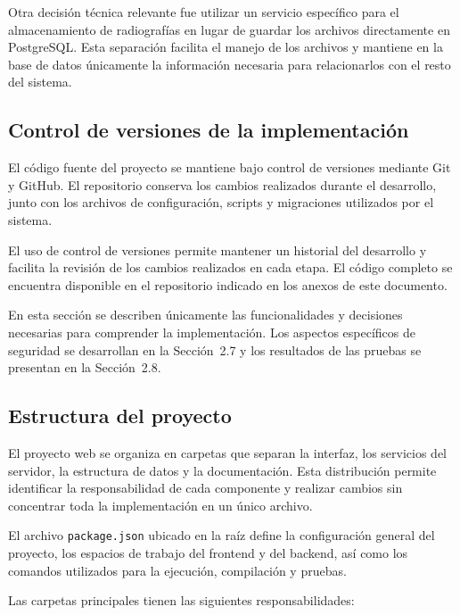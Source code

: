 Otra decisión técnica relevante fue utilizar un servicio específico para el
almacenamiento de radiografías en lugar de guardar los archivos directamente
en PostgreSQL. Esta separación facilita el manejo de los archivos y mantiene
en la base de datos únicamente la información necesaria para relacionarlos
con el resto del sistema.

\subsection{Control de versiones de la implementación}

El código fuente del proyecto se mantiene bajo control de versiones mediante
Git y GitHub. El repositorio conserva los cambios realizados durante el
desarrollo, junto con los archivos de configuración, scripts y migraciones
utilizados por el sistema.

El uso de control de versiones permite mantener un historial del desarrollo y
facilita la revisión de los cambios realizados en cada etapa. El código
completo se encuentra disponible en el repositorio indicado en los anexos de
este documento.

En esta sección se describen únicamente las funcionalidades y decisiones
necesarias para comprender la implementación. Los aspectos específicos de
seguridad se desarrollan en la Sección~2.7 y los resultados de las pruebas se
presentan en la Sección~2.8.

\subsection{Estructura del proyecto}

El proyecto web se organiza en carpetas que separan la interfaz, los
servicios del servidor, la estructura de datos y la documentación. Esta
distribución permite identificar la responsabilidad de cada componente y
realizar cambios sin concentrar toda la implementación en un único archivo.

El archivo \texttt{package.json} ubicado en la raíz define la configuración
general del proyecto, los espacios de trabajo del frontend y del backend, así
como los comandos utilizados para la ejecución, compilación y pruebas.

Las carpetas principales tienen las siguientes responsabilidades:

